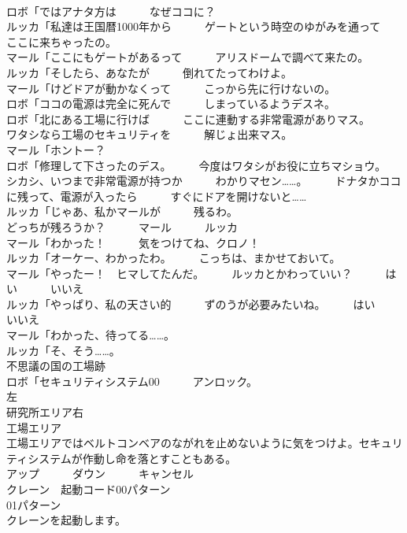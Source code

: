 \documentclass[8pt]{extreport}
\begin{document}
\begin{CJK}{UTF8}{min}
\\	ロボ「ではアナタ方は　　　なぜココに？	
\\	ルッカ「私達は王国暦1000年から　　　ゲートという時空のゆがみを通って　　　ここに来ちゃったの。	
\\	マール「ここにもゲートがあるって　　　アリスドームで調べて来たの。	
\\	ルッカ「そしたら、あなたが　　　倒れてたってわけよ。	
\\	マール「けどドアが動かなくって　　　こっから先に行けないの。	
\\	ロボ「ココの電源は完全に死んで　　　しまっているようデスネ。	
\\	ロボ「北にある工場に行けば　　　ここに連動する非常電源がありマス。　　　ワタシなら工場のセキュリティを　　　解じょ出来マス。	
\\	マール「ホントー？	
\\	ロボ「修理して下さったのデス。　　　今度はワタシがお役に立ちマショウ。　　　シカシ、いつまで非常電源が持つか　　　わかりマセン……。　　　ドナタかココに残って、電源が入ったら　　　すぐにドアを開けないと……	
\\	ルッカ「じゃあ、私かマールが　　　残るわ。	
\\	どっちが残ろうか？　　　マール　　　ルッカ	
\\	マール「わかった！　　　気をつけてね、クロノ！	
\\	ルッカ「オーケー、わかったわ。　　　こっちは、まかせておいて。	
\\	マール「やったー！　ヒマしてたんだ。　　　ルッカとかわっていい？　　　はい　　　いいえ	
\\	ルッカ「やっぱり、私の天さい的　　　ずのうが必要みたいね。　　　はい　　　いいえ	
\\	マール「わかった、待ってる……。	
\\	ルッカ「そ、そう……。	
\\	不思議の国の工場跡	
\\	ロボ「セキュリティシステム00　　　アンロック。	
\\	左　
\\	研究所エリア右　
\\	工場エリア	
\\	工場エリアではベルトコンベアのながれを止めないように気をつけよ。セキュリティシステムが作動し命を落とすこともある。	
\\	アップ　　　ダウン　　　キャンセル	
\\	クレーン　起動コード00パターン　
\\	01パターン　
\\	クレーンを起動します。

\end{CJK}
\end{document}
